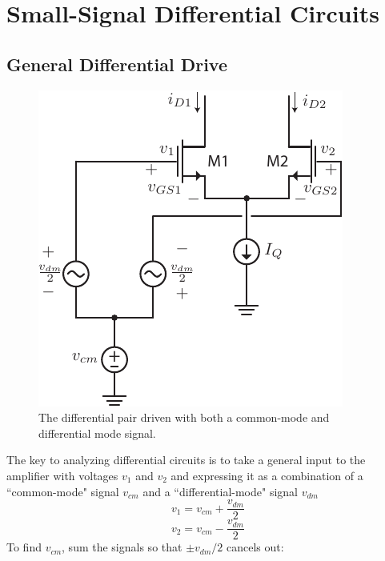 \section{Small-Signal Differential Circuits}
\subsection{General Differential Drive}
\begin{figure}[tb]
\centering
\includegraphics[scale=1]{Diff_Pair_Diff_CM.pdf}
\caption{The differential pair driven with both a common-mode and differential mode signal.} \label{fig:Diff_Pair_Diff_CM.pdf}
\end{figure}
The key to analyzing differential circuits is to take a general input to the amplifier with voltages $v_1$ and $v_2$ and expressing it as a combination of a ``common-mode" signal $v_{cm}$ and a ``differential-mode" signal $v_{dm}$
    \begin{equation}
        v_1 = v_{cm} + \frac{v_{dm}}{2}
        \label{eq:v1}
    \end{equation}
    \begin{equation}
        v_2 = v_{cm} - \frac{v_{dm}}{2}
        \label{eq:v2}
    \end{equation}
To find $v_{cm}$, sum the signals so that $\pm v_{dm}/2$ cancels out:
